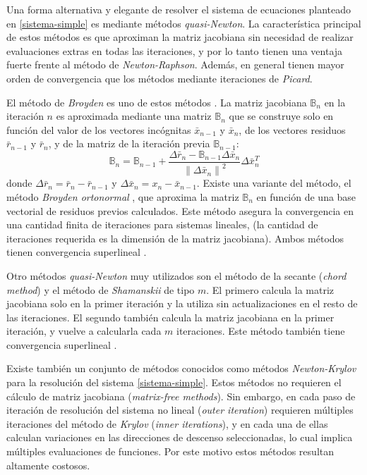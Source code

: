 Una forma alternativa y elegante de resolver el sistema de ecuaciones planteado en \ref{sistema-simple} es mediante métodos \textit{quasi-Newton}.
La característica principal de estos métodos es que aproximan la matriz jacobiana sin necesidad de realizar evaluaciones extras en todas las iteraciones,
y por lo tanto tienen una ventaja fuerte frente al método de \textit{Newton-Raphson}.
Además, en general tienen mayor orden de convergencia que los métodos mediante iteraciones de \textit{Picard}.

El método de \textit{Broyden} es uno de estos métodos \cite{broyden}.
La matriz jacobiana $\mathbb{B}_n$ en la iteración $n$ es aproximada mediante una matriz $\mathbb{B}_n$ que se construye solo en función 
del valor de los vectores incógnitas $\bar{x}_{n-1}$ y $\bar{x}_{n}$,
de los vectores residuos $\bar{r}_{n-1}$ y $\bar{r}_{n}$,
y de la matriz de la iteración previa $\mathbb{B}_{n-1}$:
\begin{equation}
\mathbb{B}_n = \mathbb{B}_{n-1} + \frac{\Delta{\bar{r}_n}-\mathbb{B}_{n-1}\Delta{\bar{x}_n}}{\left \| \Delta{\bar{x}_n} \right \| ^2}\Delta{\bar{x}}_n^T
\label{broyden}
\end{equation}
donde $\Delta{\bar{r}_n}=\bar{r}_n - \bar{r}_{n-1}$ y $\Delta{\bar{x}_n}=x_n - \bar{x}_{n-1}$.
Existe una variante del método, el método \textit{Broyden ortonormal} \cite{broyden-on}, que aproxima la matriz $\mathbb{B}_n$ en función de una base vectorial de residuos previos calculados.
Este método asegura la convergencia en una cantidad finita de iteraciones para sistemas lineales, (la cantidad de iteraciones requerida es la dimensión de la matriz jacobiana).
Ambos métodos tienen convergencia superlineal \cite{kelley}.

Otro métodos \textit{quasi-Newton} muy utilizados son el método de la secante (\textit{chord method}) \cite{kelley} y el método de \textit{Shamanskii} de tipo $m$.
El primero calcula la matriz jacobiana solo en la primer iteración y la utiliza sin actualizaciones en el resto de las iteraciones.
El segundo también calcula la matriz jacobiana en la primer iteración, y vuelve a calcularla cada $m$ iteraciones.
Este método también tiene convergencia superlineal \cite{kelley}.

Existe también un conjunto de métodos conocidos como métodos \textit{Newton-Krylov} \cite{kelley} para la resolución del sistema \ref{sistema-simple}.
Estos métodos no requieren el cálculo de matriz jacobiana (\textit{matrix-free methods}).
Sin embargo, en cada paso de iteración de resolución del sistema no lineal (\textit{outer iteration}) requieren múltiples iteraciones del método de \textit{Krylov} (\textit{inner iterations}),
y en cada una de ellas calculan variaciones en las direcciones de descenso seleccionadas,
lo cual implica múltiples evaluaciones de funciones.
Por este motivo estos métodos resultan altamente costosos.

